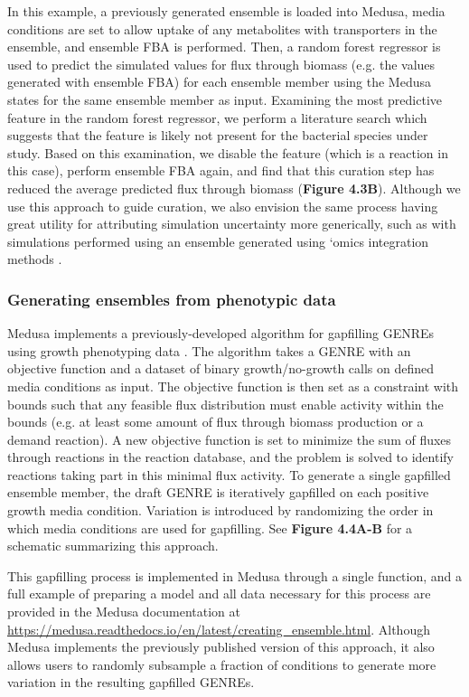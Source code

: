 \documentclass[11pt,twocolumn,notitlepage,openany,twoside]{book}
\begin{document}
\begin{refsection}
In this example, a previously generated ensemble is loaded into Medusa, media conditions are set to allow uptake of any metabolites with transporters in the ensemble, and ensemble FBA is performed. Then, a random forest regressor is used to predict the simulated values for flux through biomass (e.g. the values generated with ensemble FBA) for each ensemble member using the Medusa states for the same ensemble member as input. Examining the most predictive feature in the random forest regressor, we perform a literature search which suggests that the feature is likely not present for the bacterial species under study. Based on this examination, we disable the feature (which is a reaction in this case), perform ensemble FBA again, and find that this curation step has reduced the average predicted flux through biomass (\textbf{Figure 4.3B}). Although we use this approach to guide curation, we also envision the same process having great utility for attributing simulation uncertainty more generically, such as with simulations performed using an ensemble generated using ‘omics integration methods \cite{Blazier2012-oo}.

\subsubsection{Generating ensembles from phenotypic data}

Medusa implements a previously-developed algorithm for gapfilling GENREs using growth phenotyping data \cite{Biggs2017-md,Medlock2018-kx}. The algorithm takes a GENRE with an objective function and a dataset of binary growth/no-growth calls on defined media conditions as input. The objective function is then set as a constraint with bounds such that any feasible flux distribution must enable activity within the bounds (e.g. at least some amount of flux through biomass production or a demand reaction). A new objective function is set to minimize the sum of fluxes through reactions in the reaction database, and the problem is solved to identify reactions taking part in this minimal flux activity. To generate a single gapfilled ensemble member, the draft GENRE is iteratively gapfilled on each positive growth media condition. Variation is introduced by randomizing the order in which media conditions are used for gapfilling. See \textbf{Figure 4.4A-B} for a schematic summarizing this approach.

This gapfilling process is implemented in Medusa through a single function, and a full example of preparing a model and all data necessary for this process are provided in the Medusa documentation at \url{https://medusa.readthedocs.io/en/latest/creating_ensemble.html}. Although Medusa implements the previously published version of this approach, it also allows users to randomly subsample a fraction of conditions to generate more variation in the resulting gapfilled GENREs.


\end{refsection}
\end{document}
